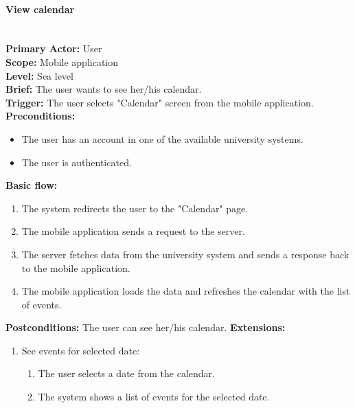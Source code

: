 \paragraph{\large{View calendar}}\mbox{}\\[2pt]
\textbf{Primary Actor:} User\\
\textbf{Scope:} Mobile application\\
\textbf{Level:} Sea level\\
\textbf{Brief:} The user wants to see her/his calendar.\\
\textbf{Trigger:} The user selects "Calendar" screen from the mobile application.\\
\textbf{Preconditions:}
\begin{itemize}
    \item The user has an account in one of the available university systems.
    \item The user is authenticated.
\end{itemize}
\textbf{Basic flow:}
\begin{enumerate}
    \item The system redirects the user to the "Calendar" page.
    \item The mobile application sends a request to the server.
    \item The server fetches data from the university system and sends a response back to the mobile application.
    \item The mobile application loads the data and refreshes the calendar with the list of events.
\end{enumerate}
\textbf{Postconditions:}
The user can see her/his calendar.
\textbf{Extensions:}
\begin{enumerate}[label=\alph*.]
    \item See events for selected date:
    \begin{enumerate}
        \item The user selects a date from the calendar.
        \item The system shows a list of events for the selected date.
    \end{enumerate}
\end{enumerate}


